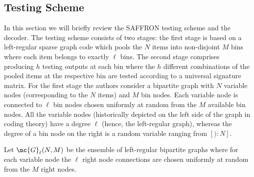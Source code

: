 \documentclass[conference,twocolumn]{IEEEtran}
\DeclareMathOperator*{\bigORtxt}{\scalerel*{\text{$\vee$}}{\textstyle\sum}}
\begin{document}
%
\subsection*{Testing Scheme}
In this section we will briefly review the SAFFRON testing scheme \cite{lee2015saffron} and the decoder. The testing scheme consists of two stages: the first stage is based on a left-regular sparse graph code which pools the $N$ items into non-disjoint $M$ bins where each item belongs to exactly $\ell$ bins. The second stage comprises producing $h$ testing outputs at each bin where the $h$ different combinations of the pooled items at the respective bin are tested according to a universal signature matrix. For the first stage the authors consider a bipartite graph with $N$ variable nodes (corresponding to the $N$ items) and $M$ bin nodes. Each variable node is connected to $\ell$ bin nodes chosen uniformly at random from the $M$ available bin nodes. All the variable nodes (historically depicted on the left side of the graph in coding theory) have a degree $\ell$ (hence, the left-regular graph), whereas the degree of a bin node on the right is a random variable ranging from $[):N]$.

\begin{definition}
Let $\mc{G}_{\ell}(N,M)$ be the ensemble of left-regular bipartite graphs where for each variable node the $\ell$ right node connections are chosen uniformly at random from the $M$ right nodes.
\end{definition}
\end{document}
